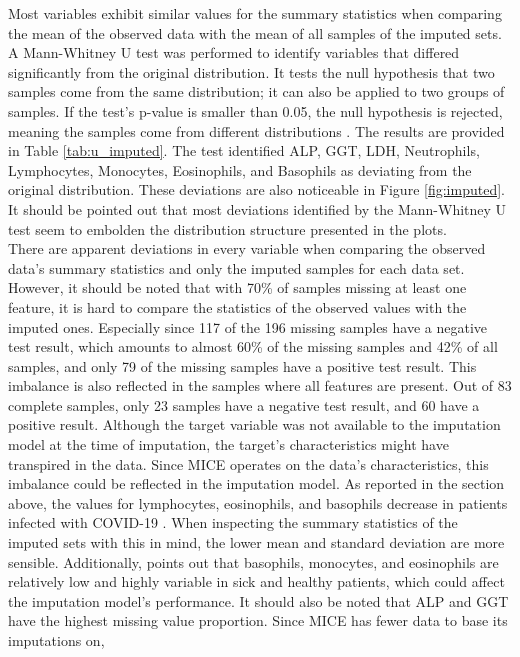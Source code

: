 Most variables exhibit similar values for the summary statistics when comparing 
the mean of the observed data with the mean of all samples of the imputed sets. 
A Mann-Whitney U test was performed to identify variables that differed 
significantly from the original distribution. It tests the null hypothesis that 
two samples come from the same distribution; it can also be applied to two 
groups of samples. If the test's p-value is smaller 
than 0.05, the null hypothesis is rejected, meaning the samples come from 
different distributions \cite{RN211}. The results are provided in Table 
\ref{tab:u_imputed}. The test identified ALP, GGT, LDH, Neutrophils, 
Lymphocytes, Monocytes, Eosinophils, and Basophils as deviating from the 
original distribution. These deviations are also noticeable in Figure 
\ref{fig:imputed}. It should be pointed out that most deviations identified by 
the Mann-Whitney U test seem to embolden the distribution structure presented in 
the plots. 
\\
There are apparent deviations in every variable when comparing the 
observed data's summary statistics and only the imputed samples for each data 
set. However, it should be noted that with 70\% of samples missing at least one 
feature, it is hard to compare the statistics of the observed values with the 
imputed ones. Especially since 117 of the 196 missing samples have a negative 
test result, which amounts to almost 60\% of the missing samples and 42\% of all 
samples, and only 79 of the missing samples have a positive test result. This 
imbalance is also reflected in the samples where all features are present. Out 
of 83 complete samples, only 23 samples have a negative test result, and 60 have 
a positive result. Although the target variable was not available to the 
imputation model at the time of imputation, the target's characteristics might 
have transpired in the data. Since MICE operates on the data's characteristics, 
this imbalance could be reflected in the imputation model. As reported in the 
section above, the values for lymphocytes, eosinophils, and basophils decrease 
in patients infected with COVID-19 \cite{RN162, RN181}. When inspecting the 
summary statistics of the imputed sets with this in mind, the lower mean and 
standard deviation are more sensible. Additionally, \cite{RN162} points out 
that basophils, monocytes, and eosinophils are relatively low and highly 
variable in sick and healthy patients, which could affect the imputation 
model's performance. It should also be noted that ALP and GGT have the highest 
missing value proportion. Since MICE has fewer data to base its imputations on, 
